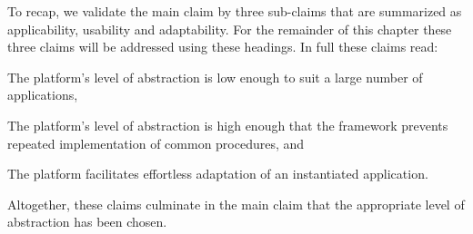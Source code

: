 To recap, we validate the main claim by three sub-claims that are summarized as applicability, usability and adaptability. For the remainder of this chapter these three claims will be addressed using these headings. In full these claims read:
\begin{description}[style=nextline]
\nospace
\item[Applicability] The platform's level of abstraction is low enough to suit a large number of applications,
\item[Usability] The platform's level of abstraction is high enough that the framework prevents repeated implementation of common procedures, and
\item[Adaptability] The platform facilitates effortless adaptation of an instantiated application.
\end{description}
Altogether, these claims culminate in the main claim that the appropriate level of abstraction has been chosen.




